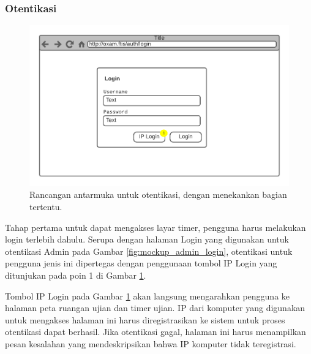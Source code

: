 \subsubsection{Otentikasi}
    \begin{figure}
        \centering
        \includegraphics[width=0.7\paperwidth]{Gambar/mockups/Mockup--DosenPengawas - Login.pdf}
        \caption{Rancangan antarmuka untuk otentikasi, dengan menekankan bagian tertentu.}
        \label{fig:mockup_dosen_login}
    \end{figure}
    Tahap pertama untuk dapat mengakses layar timer, pengguna harus melakukan
    login terlebih dahulu. Serupa dengan halaman Login yang digunakan untuk
    otentikasi Admin pada Gambar \ref{fig:mockup_admin_login}, otentikasi untuk
    pengguna jenis ini dipertegas dengan penggunaan tombol IP Login yang
    ditunjukan pada poin 1 di Gambar \ref{fig:mockup_dosen_login}.
    
    Tombol IP Login pada Gambar \ref{fig:mockup_dosen_login} akan langsung
    mengarahkan pengguna ke halaman peta ruangan ujian dan timer ujian. IP dari
    komputer yang digunakan untuk mengakses halaman ini harus diregistrasikan ke
    sistem untuk proses otentikasi dapat berhasil. Jika otentikasi gagal,
    halaman ini harus menampilkan pesan kesalahan yang mendeskripsikan bahwa IP
    komputer tidak teregistrasi.
    
